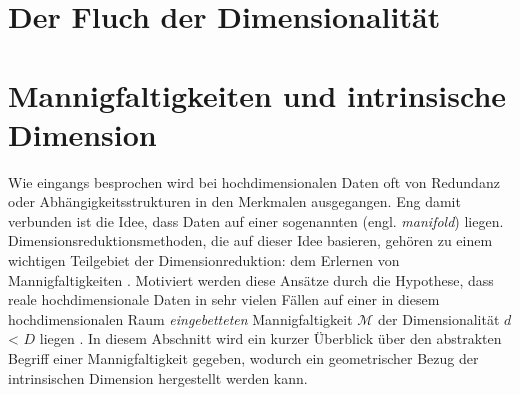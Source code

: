 \section{Der Fluch der Dimensionalität}
\label{ch:Dimensionsreduktion:FluchDerDim}

\section{Mannigfaltigkeiten und intrinsische Dimension}
\label{ch:Dimensionsreduktion:MannigfaltigkeitenIntrinsDim}

Wie eingangs besprochen wird bei hochdimensionalen Daten oft von Redundanz oder
Abhängigkeitsstrukturen in den Merkmalen ausgegangen. Eng damit verbunden ist die Idee, dass Daten
auf einer sogenannten  (engl. \textit{manifold}) liegen.
Dimensionsreduktionsmethoden, die auf dieser Idee basieren, gehören zu einem wichtigen Teilgebiet
der Dimensionreduktion: dem Erlernen von Mannigfaltigkeiten \parencite{Cayton.2005}. Motiviert werden diese Ansätze durch die Hypothese, dass reale
hochdimensionale Daten in sehr vielen Fällen auf einer in diesem hochdimensionalen Raum
\textit{eingebetteten} Mannigfaltigkeit $\mathcal{M}$ der Dimensionalität $d$ < $D$ liegen \parencite[vgl.][1]{Cayton.2005}. In diesem Abschnitt wird ein kurzer Überblick über den abstrakten
Begriff einer Mannigfaltigkeit gegeben, wodurch ein geometrischer Bezug der intrinsischen Dimension
hergestellt werden kann.

